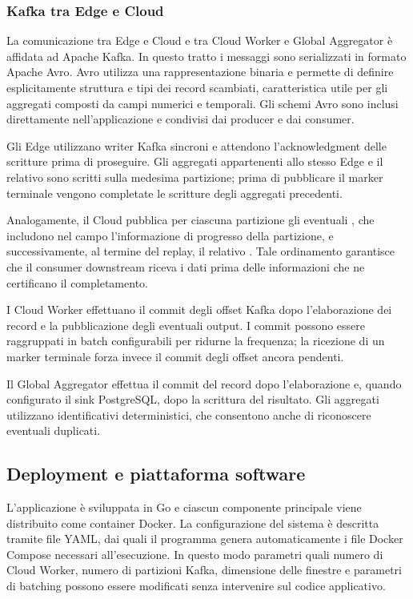 \subsubsection{Kafka tra Edge e Cloud}

La comunicazione tra Edge e Cloud e tra Cloud Worker e Global Aggregator è
affidata ad Apache Kafka. In questo tratto i messaggi sono serializzati in formato Apache Avro. Avro
utilizza una rappresentazione binaria e permette di definire esplicitamente
struttura e tipi dei record scambiati, caratteristica utile per gli aggregati
composti da campi numerici e temporali. Gli schemi Avro sono inclusi
direttamente nell'applicazione e condivisi dai producer e dai consumer.

Gli Edge utilizzano writer Kafka sincroni e attendono l'acknowledgment delle
scritture prima di proseguire. Gli aggregati appartenenti allo stesso Edge e
il relativo  sono scritti sulla medesima partizione;
prima di pubblicare il marker terminale vengono completate le scritture degli
aggregati precedenti.

Analogamente, il Cloud pubblica per ciascuna partizione gli eventuali
, che includono nel campo
 l'informazione di progresso della partizione, e
successivamente, al termine del replay, il relativo
. Tale ordinamento garantisce che il consumer
downstream riceva i dati prima delle informazioni che ne certificano il
completamento.

I Cloud Worker effettuano il commit degli offset Kafka dopo l'elaborazione
dei record e la pubblicazione degli eventuali output. I commit possono essere
raggruppati in batch configurabili per ridurne la frequenza; la ricezione di
un marker terminale forza invece il commit degli offset ancora pendenti.

Il Global Aggregator effettua il commit del record dopo l'elaborazione e,
quando configurato il sink PostgreSQL, dopo la scrittura del risultato.
Gli aggregati utilizzano identificativi deterministici, che consentono anche
di riconoscere eventuali duplicati.
\subsection{Deployment e piattaforma software}

L'applicazione è sviluppata in Go e ciascun componente principale viene
distribuito come container Docker. La configurazione del sistema è descritta
tramite file YAML, dai quali il programma  genera
automaticamente i file Docker Compose necessari all'esecuzione. In questo modo
parametri quali numero di Cloud Worker, numero di partizioni Kafka, dimensione
delle finestre e parametri di batching possono essere modificati senza
intervenire sul codice applicativo.

